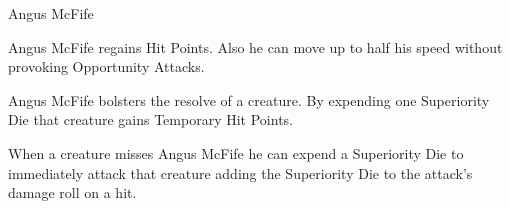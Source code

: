 \begin{DndMonster}[width=\textwidth + 8pt]{Angus McFife}
\begin{multicols}{2}
		Angus McFife regains  Hit Points. Also he can move up to half his speed without provoking Opportunity Attacks.
		
	    Angus McFife bolsters the resolve of a creature. By expending one Superiority Die that creature gains  Temporary Hit Points.
		
		When a creature misses Angus McFife he can expend a Superiority Die to immediately attack that creature adding the Superiority Die to the attack's damage roll on a hit.
	\end{multicols}
\end{DndMonster}